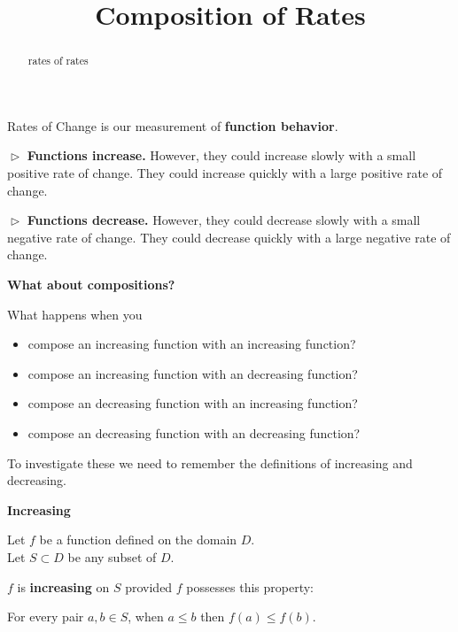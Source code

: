 \documentclass{ximera}
\title{Composition of Rates}
\begin{document}
\begin{abstract}
rates of rates
\end{abstract}
\maketitle




Rates of Change is our measurement of \textbf{function behavior}.


$\vartriangleright$  \textbf{\textcolor{blue!55!black}{Functions increase.}}  However, they could increase slowly with a small positive rate of change.  They could increase quickly with a large positive rate of change. 



$\vartriangleright$  \textbf{\textcolor{blue!55!black}{Functions decrease.}}  However, they could decrease slowly with a small negative rate of change.  They could decrease quickly with a large negative rate of change. 





\textbf{\textcolor{purple!85!blue}{What about compositions?}}





What happens when you


\begin{itemize}
\item compose an increasing function with an increasing function?
\item compose an increasing function with an decreasing function?
\item compose an decreasing function with an increasing function?
\item compose an decreasing function with an decreasing function?
\end{itemize}



To investigate these we need to remember the definitions of increasing and decreasing.






\begin{summary} \textbf{\textcolor{green!50!black}{Increasing}} 


Let $f$ be a function defined on the domain $D$. \\
Let $S \subset D$ be any subset of $D$.

$f$ is \textbf{increasing} on $S$ provided $f$ possesses this property:  


\begin{center}
For every pair $a, b \in S$, when $a \leq b$ then $f(a) \leq f(b)$.
\end{center}

\end{summary}
\end{document}
